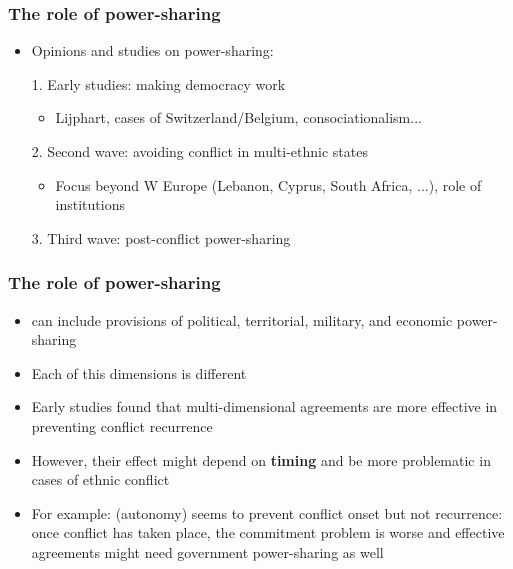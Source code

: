 \documentclass[aspectratio=43]{beamer}
\begin{document}
\begin{frame}
\frametitle{The role of power-sharing}
\centering

\begin{itemize}[<+->]
  \item Opinions and studies on power-sharing:
  \item[1.] Early studies: making democracy work
    \begin{itemize}
      \item Lijphart, cases of Switzerland/Belgium, consociationalism...
    \end{itemize}
  \item[2.] Second wave: avoiding conflict in multi-ethnic states
  \begin{itemize}
    \item Focus beyond W Europe (Lebanon, Cyprus, South Africa, ...), role of institutions
  \end{itemize}
  \item[3.] Third wave: post-conflict power-sharing
\end{itemize}

\end{frame}

\begin{frame}
\frametitle{The role of power-sharing}
\centering

\begin{itemize}
  \item {} can include provisions of political, territorial, military, and economic power-sharing
  \item<2-> Each of this dimensions is different
  \item<2-> Early studies found that multi-dimensional agreements are more effective in preventing conflict recurrence
  \item<3-> However, their effect might depend on \textbf{timing} and be more problematic in cases of ethnic conflict
  \item<4-> For example:  (autonomy) seems to prevent conflict onset but not recurrence: once conflict has taken place, the commitment problem is worse and effective agreements might need government power-sharing as well
\end{itemize}

\end{frame}
\end{document}
